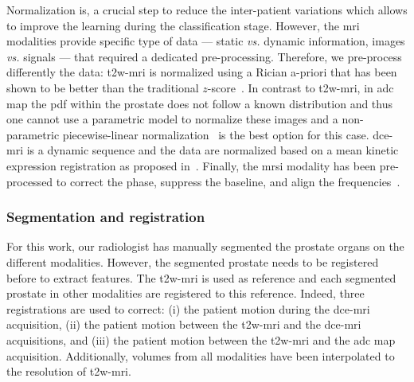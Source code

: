 Normalization is, a crucial step to reduce the inter-patient
variations which allows to improve the learning during the
classification stage.
However, the \ac{mri} modalities provide specific type of data --- static
\emph{vs.} dynamic information, images \emph{vs.} signals --- that
required a dedicated pre-processing.
Therefore, we pre-process differently the data:
\ac{t2w}-\ac{mri} is normalized using a Rician
a-priori that has been shown to be better than the traditional
$z$-score~\cite{lemaitre2016normalization}.
In contrast to \ac{t2w}-\ac{mri}, in \ac{adc} map the \ac{pdf} within the
prostate does not follow a known distribution and thus one cannot use
a parametric model to normalize these images and a non-parametric
piecewise-linear normalization~\cite{Nyul2000} is the best option for
this case.
\ac{dce}-\ac{mri} is a dynamic sequence and the data are normalized
based on a mean kinetic expression registration as proposed
in~\cite{Lemaitre2016thesis}.
Finally, the \ac{mrsi} modality has been pre-processed to correct the
phase, suppress the baseline, and align the frequencies~\cite{Parfait2012}.

\subsubsection{Segmentation and registration}\label{subsec:chp6:method:Seg-Reg}

For this work, our radiologist has manually segmented the prostate
organs on the different modalities.
However, the segmented prostate needs to be registered before to
extract features.
The \ac{t2w}-\ac{mri} is used as reference and each segmented prostate
in other modalities are registered to this reference.
Indeed, three registrations are used to correct: (i) the patient
motion during the \ac{dce}-\ac{mri} acquisition, (ii) the patient
motion between the \ac{t2w}-\ac{mri} and the \ac{dce}-\ac{mri}
acquisitions, and (iii) the patient motion between the
\ac{t2w}-\ac{mri} and the \ac{adc} map acquisition.
Additionally, volumes from all modalities have been interpolated to the
resolution of \ac{t2w}-\ac{mri}.


